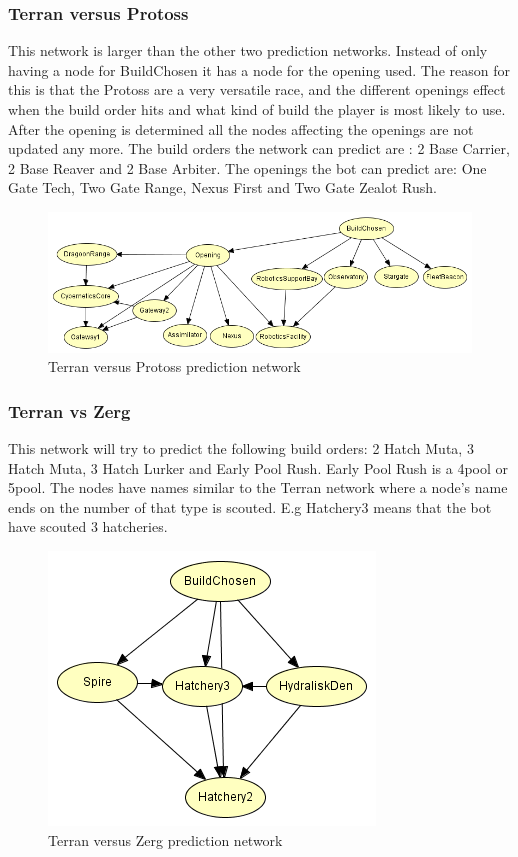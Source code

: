 \subsubsection{Terran versus Protoss}
	This network is larger than the other two prediction networks. Instead of only having a node for BuildChosen it has a node for the opening 
	used. The reason for this is that the Protoss are a very versatile race, and the different openings effect when the build order hits and what kind of build 
	the player is most likely to use. After the opening is determined all the nodes affecting the openings are not updated any more. The build orders 
	the network can predict are : 2 Base Carrier, 2 Base Reaver and 2 Base Arbiter. The openings the bot can predict are: One Gate Tech, Two Gate Range, 
	Nexus First and Two Gate Zealot Rush.

\begin{figure}[H]
	\includegraphics[scale=0.8]{Figures/BayesianPictures/tvp.png}
	\caption{Terran versus Protoss prediction network}
	\label{fig:tvpnetwork}
\end{figure}	

\subsubsection{Terran vs Zerg}
	This network will try to predict the following build orders: 2 Hatch Muta, 3 Hatch Muta, 3 Hatch Lurker and Early Pool Rush. Early Pool Rush is a 4pool or 5pool. The nodes have names similar to the Terran network where a node's name ends on the number of that type is scouted. 
	E.g Hatchery3 means that the bot have scouted 3 hatcheries.

\begin{figure}[H]
	\includegraphics[scale=1]{Figures/BayesianPictures/tvz.png}
	\caption{Terran versus Zerg prediction network}
	\label{fig:tvznetwork}
\end{figure}	
		
